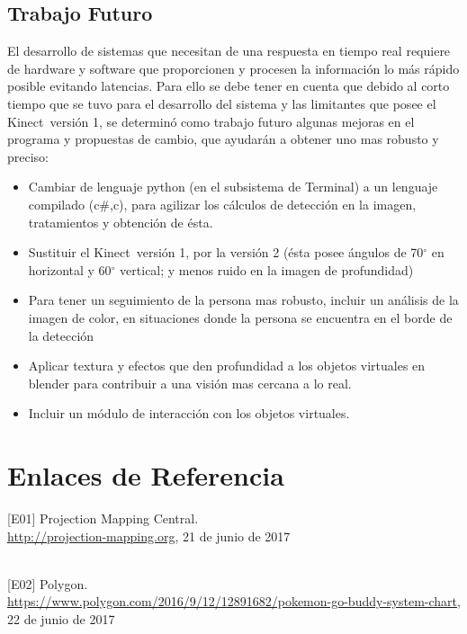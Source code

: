 \documentclass[a4paper,openright,12pt]{report}
\begin{document}
\section{Trabajo Futuro}
El desarrollo de sistemas que necesitan de una respuesta en tiempo real requiere de hardware y software que proporcionen y procesen la información lo más rápido posible evitando latencias. Para ello se debe tener en cuenta que debido al corto tiempo que se tuvo para el desarrollo del sistema y las limitantes que posee el Kinect\textcopyright\ versión 1, se determinó como trabajo futuro algunas mejoras en el programa y propuestas de cambio, que ayudarán a obtener uno mas robusto y preciso: 
\begin{itemize}
	\item Cambiar de lenguaje python (en el subsistema de Terminal) a un lenguaje compilado (c\#,c), para agilizar los cálculos de detección en la imagen, tratamientos y obtención de ésta.
	\item Sustituir el Kinect\textcopyright\ versión 1, por la versión 2 (ésta posee ángulos de 70$^{\circ}$ en horizontal y 60$^{\circ}$ vertical; y menos ruido en la imagen de profundidad)
	\item Para tener un seguimiento de la persona mas robusto, incluir un análisis de la imagen de color, en situaciones donde la persona se encuentra en el borde de la detección
	\item Aplicar textura y efectos que den profundidad a los objetos virtuales en blender para contribuir a una visión mas cercana a lo real.
	\item Incluir un módulo de interacción con los objetos virtuales.
\end{itemize}

\cleardoublepage
{}


\chapter*{Enlaces de Referencia}
\hypertarget{e01}{
[E01] Projection Mapping Central. \\\url{http://projection-mapping.org}, 21 de junio de 2017}\\

\hypertarget{e02}{[E02] Polygon. \\\url{https://www.polygon.com/2016/9/12/12891682/pokemon-go-buddy-system-chart}, 22 de junio de 2017}\\
\end{document}
